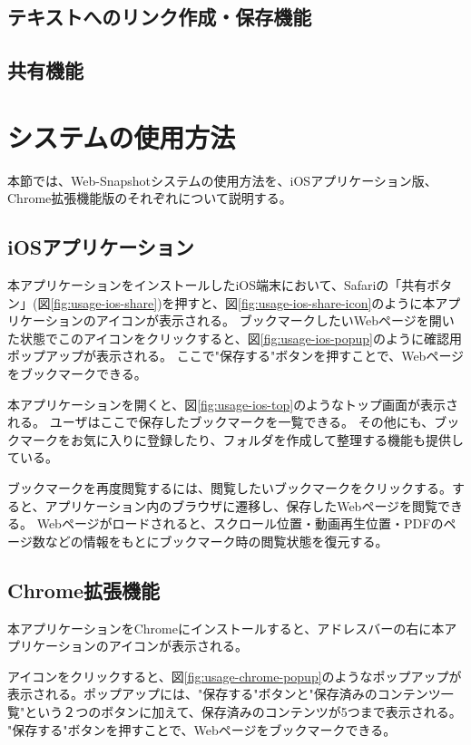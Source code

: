 \subsection{テキストへのリンク作成・保存機能}
\subsection{共有機能}

\section{システムの使用方法}
本節では、Web-Snapshotシステムの使用方法を、iOSアプリケーション版、Chrome拡張機能版のそれぞれについて説明する。

\subsection{iOSアプリケーション}
本アプリケーションをインストールしたiOS端末において、Safariの「共有ボタン」(図\ref{fig:usage-ios-share})を押すと、図\ref{fig:usage-ios-share-icon}のように本アプリケーションのアイコンが表示される。
ブックマークしたいWebページを開いた状態でこのアイコンをクリックすると、図\ref{fig:usage-ios-popup}のように確認用ポップアップが表示される。
ここで"保存する"ボタンを押すことで、Webページをブックマークできる。

本アプリケーションを開くと、図\ref{fig:usage-ios-top}のようなトップ画面が表示される。
ユーザはここで保存したブックマークを一覧できる。
その他にも、ブックマークをお気に入りに登録したり、フォルダを作成して整理する機能も提供している。

ブックマークを再度閲覧するには、閲覧したいブックマークをクリックする。すると、アプリケーション内のブラウザに遷移し、保存したWebページを閲覧できる。
Webページがロードされると、スクロール位置・動画再生位置・PDFのページ数などの情報をもとにブックマーク時の閲覧状態を復元する。

\subsection{Chrome拡張機能}
本アプリケーションをChromeにインストールすると、アドレスバーの右に本アプリケーションのアイコンが表示される。

アイコンをクリックすると、図\ref{fig:usage-chrome-popup}のようなポップアップが表示される。ポップアップには、"保存する"ボタンと"保存済みのコンテンツ一覧"という２つのボタンに加えて、保存済みのコンテンツが5つまで表示される。
"保存する"ボタンを押すことで、Webページをブックマークできる。



